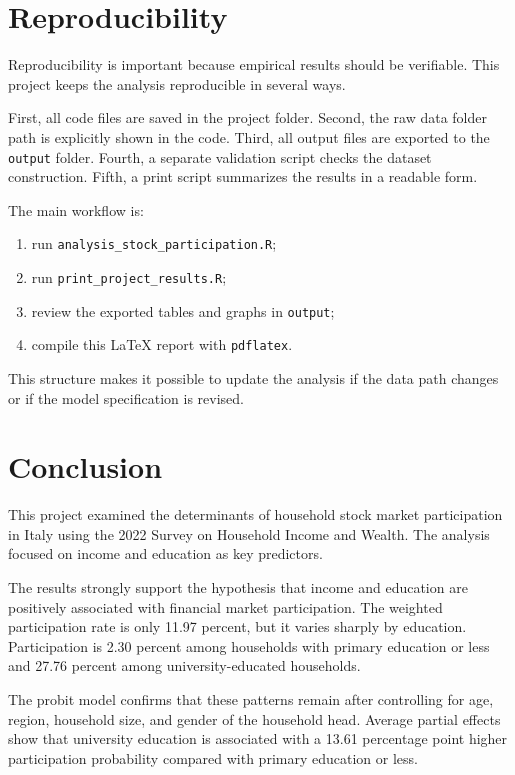 \documentclass[12pt]{article}
\begin{document}
\section{Reproducibility}

Reproducibility is important because empirical results should be verifiable. This project keeps the analysis reproducible in several ways.

First, all code files are saved in the project folder. Second, the raw data folder path is explicitly shown in the code. Third, all output files are exported to the \texttt{output} folder. Fourth, a separate validation script checks the dataset construction. Fifth, a print script summarizes the results in a readable form.

The main workflow is:

\begin{enumerate}[leftmargin=*]
    \item run \texttt{analysis\_stock\_participation.R};
    \item run \texttt{print\_project\_results.R};
    \item review the exported tables and graphs in \texttt{output};
    \item compile this LaTeX report with \texttt{pdflatex}.
\end{enumerate}

This structure makes it possible to update the analysis if the data path changes or if the model specification is revised.

\section{Conclusion}

This project examined the determinants of household stock market participation in Italy using the 2022 Survey on Household Income and Wealth. The analysis focused on income and education as key predictors.

The results strongly support the hypothesis that income and education are positively associated with financial market participation. The weighted participation rate is only 11.97 percent, but it varies sharply by education. Participation is 2.30 percent among households with primary education or less and 27.76 percent among university-educated households.

The probit model confirms that these patterns remain after controlling for age, region, household size, and gender of the household head. Average partial effects show that university education is associated with a 13.61 percentage point higher participation probability compared with primary education or less.
\end{document}
